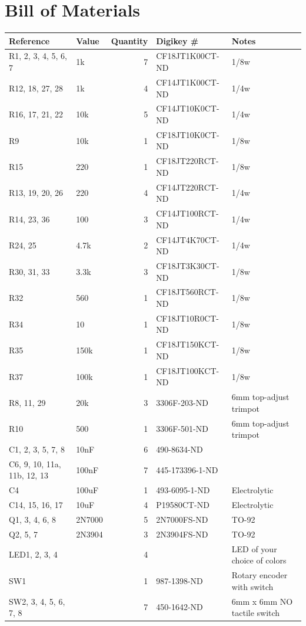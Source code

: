 \documentclass[11pt]{article}
\begin{document}
\section{Bill of Materials}
\label{sec:orgf12d741}
\begin{center}
\begin{tabular}{llrll}
\textbf{Reference} & \textbf{Value} & \textbf{Quantity} & \textbf{Digikey \#} & \textbf{Notes}\\
\hline
R1, 2, 3, 4, 5, 6, 7 & 1k & 7 & CF18JT1K00CT-ND & 1/8w\\
R12, 18, 27, 28 & 1k & 4 & CF14JT1K00CT-ND & 1/4w\\
R16, 17, 21, 22 & 10k & 5 & CF14JT10K0CT-ND & 1/4w\\
R9 & 10k & 1 & CF18JT10K0CT-ND & 1/8w\\
R15 & 220 & 1 & CF18JT220RCT-ND & 1/8w\\
R13, 19, 20, 26 & 220 & 4 & CF14JT220RCT-ND & 1/4w\\
R14, 23, 36 & 100 & 3 & CF14JT100RCT-ND & 1/4w\\
R24, 25 & 4.7k & 2 & CF14JT4K70CT-ND & 1/4w\\
R30, 31, 33 & 3.3k & 3 & CF18JT3K30CT-ND & 1/8w\\
R32 & 560 & 1 & CF18JT560RCT-ND & 1/8w\\
R34 & 10 & 1 & CF18JT10R0CT-ND & 1/8w\\
R35 & 150k & 1 & CF18JT150KCT-ND & 1/8w\\
R37 & 100k & 1 & CF18JT100KCT-ND & 1/8w\\
R8, 11, 29 & 20k & 3 & 3306F-203-ND & 6mm top-adjust trimpot\\
R10 & 500 & 1 & 3306F-501-ND & 6mm top-adjust trimpot\\
C1, 2, 3, 5, 7, 8 & 10nF & 6 & 490-8634-ND & \\
C6, 9, 10, 11a, 11b, 12, 13 & 100nF & 7 & 445-173396-1-ND & \\
C4 & 100uF & 1 & 493-6095-1-ND & Electrolytic\\
C14, 15, 16, 17 & 10uF & 4 & P19580CT-ND & Electrolytic\\
Q1, 3, 4, 6, 8 & 2N7000 & 5 & 2N7000FS-ND & TO-92\\
Q2, 5, 7 & 2N3904 & 3 & 2N3904FS-ND & TO-92\\
LED1, 2, 3, 4 &  & 4 &  & LED of your choice of colors\\
SW1 &  & 1 & 987-1398-ND & Rotary encoder with switch\\
SW2, 3, 4, 5, 6, 7, 8 &  & 7 & 450-1642-ND & 6mm x 6mm NO tactile switch\\

\end{tabular}
\end{center}
\end{document}
